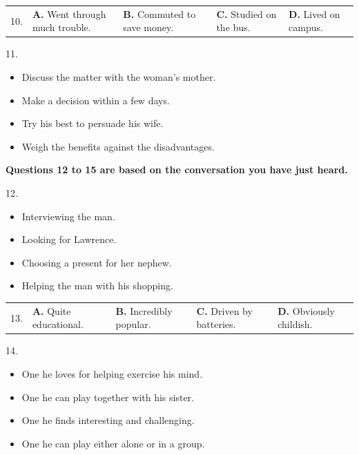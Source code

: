 \documentclass[UTF8,11pt]{ctexart}
\begin{document}
\noindent\begin{tabularx}{\linewidth}{@{}lXXXX@{}}10. & \textbf{A.} Went through much trouble. & \textbf{B.} Commuted to save money. & \textbf{C.} Studied on the bus. & \textbf{D.} Lived on campus.\\\end{tabularx}\par

11.


\begin{itemize}[leftmargin=2em,itemsep=.2em,topsep=.4em]\item[A.] Discuss the matter with the woman’s mother.
\item[B.] Make a decision within a few days.
\item[C.] Try his best to persuade his wife.
\item[D.] Weigh the benefits against the disadvantages.
\end{itemize}

\textbf{Questions 12 to 15 are based on the conversation you have just heard.}


12.


\begin{itemize}[leftmargin=2em,itemsep=.2em,topsep=.4em]\item[A.] Interviewing the man.
\item[B.] Looking for Lawrence.
\item[C.] Choosing a present for her nephew.
\item[D.] Helping the man with his shopping.
\end{itemize}

\noindent\begin{tabularx}{\linewidth}{@{}lXXXX@{}}13. & \textbf{A.} Quite educational. & \textbf{B.} Incredibly popular. & \textbf{C.} Driven by batteries. & \textbf{D.} Obviously childish.\\\end{tabularx}\par

14.


\begin{itemize}[leftmargin=2em,itemsep=.2em,topsep=.4em]\item[A.] One he loves for helping exercise his mind.
\item[B.] One he can play together with his sister.
\item[C.] One he finds interesting and challenging.
\item[D.] One he can play either alone or in a group.
\end{itemize}
\end{document}
